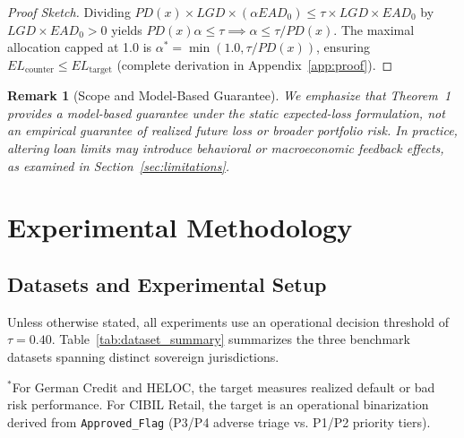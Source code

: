 \documentclass[manuscript,screen,review,anonymous]{acmart}
\newtheorem{remark}{Remark}
\begin{document}
\begin{proof}[Proof Sketch]
Dividing $PD(x) \times LGD \times (\alpha EAD_0) \le \tau \times LGD \times EAD_0$ by $LGD \times EAD_0 > 0$ yields $PD(x) \alpha \le \tau \implies \alpha \le \tau / PD(x)$. The maximal allocation capped at 1.0 is $\alpha^* = \min(1.0, \tau / PD(x))$, ensuring $EL_{\text{counter}} \le EL_{\text{target}}$ (complete derivation in Appendix~\ref{app:proof}).
\end{proof}

\begin{remark}[Scope and Model-Based Guarantee]
We emphasize that Theorem~1 provides a model-based guarantee under the static expected-loss formulation, not an empirical guarantee of realized future loss or broader portfolio risk. In practice, altering loan limits may introduce behavioral or macroeconomic feedback effects, as examined in Section~\ref{sec:limitations}.
\end{remark}

\section{Experimental Methodology}

\subsection{Datasets and Experimental Setup}
Unless otherwise stated, all experiments use an operational decision threshold of $\tau = 0.40$. Table~\ref{tab:dataset_summary} summarizes the three benchmark datasets spanning distinct sovereign jurisdictions.

\begin{table}[!htbp]
\centering
\caption{Dataset Ecosystems and Experimental Setup Overview.}
\label{tab:dataset_summary}
\small
\setlength{\tabcolsep}{4.5pt}
\par\vspace{2pt}\footnotesize{$^*$For German Credit and HELOC, the target measures realized default or bad risk performance. For CIBIL Retail, the target is an operational binarization derived from \texttt{Approved\_Flag} (P3/P4 adverse triage vs. P1/P2 priority tiers).}
\end{table}
\end{document}
